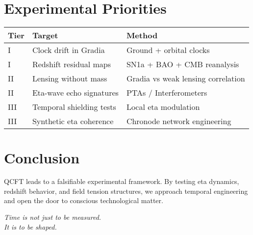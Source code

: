 \documentclass[12pt]{article}
\begin{document}
\section{Experimental Priorities}

\begin{tabular}{@{}lll@{}}
\toprule
Tier & Target & Method \\
\midrule
I & Clock drift in Gradia & Ground + orbital clocks \\
I & Redshift residual maps & SN1a + BAO + CMB reanalysis \\
II & Lensing without mass & Gradia vs weak lensing correlation \\
II & Eta-wave echo signatures & PTAs / Interferometers \\
III & Temporal shielding tests & Local eta modulation \\
III & Synthetic eta coherence & Chronode network engineering \\
\bottomrule
\end{tabular}

\section*{Conclusion}

QCFT leads to a falsifiable experimental framework. By testing eta dynamics, redshift behavior, and field tension structures, we approach temporal engineering and open the door to conscious technological matter.

\begin{center}
\textit{Time is not just to be measured.\\It is to be shaped.}
\end{center}
\end{document}
